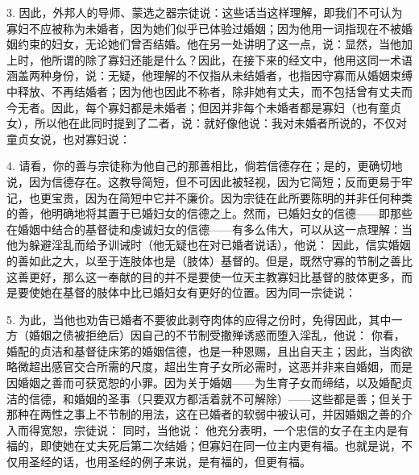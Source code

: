 3. 因此，外邦人的导师、蒙选之器宗徒说：这些话当这样理解，即我们不可认为寡妇不应被称为未婚者，因为她们似乎已体验过婚姻；因为他用一词指现在不被婚姻约束的妇女，无论她们曾否结婚。他在另一处讲明了这一点，说：显然，当他加上时，他所谓的除了寡妇还能是什么？因此，在接下来的经文中，他用这同一术语涵盖两种身份，说：无疑，他理解的不仅指从未结婚者，也指因守寡而从婚姻束缚中释放、不再结婚者；因为他也因此不称者，除非她有丈夫，而不包括曾有丈夫而今无者。因此，每个寡妇都是未婚者；但因并非每个未婚者都是寡妇（也有童贞女），所以他在此同时提到了二者，说：就好像他说：我对未婚者所说的，不仅对童贞女说，也对寡妇说：\par

4. 请看，你的善与宗徒称为他自己的那善相比，倘若信德存在；是的，更确切地说，因为信德存在。这教导简短，但不可因此被轻视，因为它简短；反而更易于牢记，也更宝贵，因为在简短中它并不廉价。因为宗徒在此所要陈明的并非任何种类的善，他明确地将其置于已婚妇女的信德之上。然而，已婚妇女的信德——即那些在婚姻中结合的基督徒和虔诚妇女的信德——有多么伟大，可以从这一点理解：当他为躲避淫乱而给予训诫时（他无疑也在对已婚者说话），他说： 因此，信实婚姻的善如此之大，以至于连肢体也是（肢体）基督的。但是，既然守寡的节制之善比这善更好，那么这一奉献的目的并不是要使一位天主教寡妇比基督的肢体更多，而是要使她在基督的肢体中比已婚妇女有更好的位置。因为同一宗徒说：\par

5. 为此，当他也劝告已婚者不要彼此剥夺肉体的应得之份时，免得因此，其中一方（婚姻之债被拒绝后）因自己的不节制受撒殚诱惑而堕入淫乱，他说： 你看，婚配的贞洁和基督徒床笫的婚姻信德，也是一种恩赐，且出自天主；因此，当肉欲略微超出感官交合所需的尺度，超出生育子女所必需时，这恶并非来自婚姻，而是因婚姻之善而可获宽恕的小罪。因为关于婚姻——为生育子女而缔结，以及婚配贞洁的信德，和婚姻的圣事（只要双方都活着就不可解除）——这些都是善；但关于那种在两性之事上不节制的用法，这在已婚者的软弱中被认可，并因婚姻之善的介入而得宽恕，宗徒说： 同时，当他说： 他充分表明，一个忠信的女子在主内是有福的，即使她在丈夫死后第二次结婚；但寡妇在同一位主内更有福。也就是说，不仅用圣经的话，也用圣经的例子来说，是有福的，但更有福。\par

